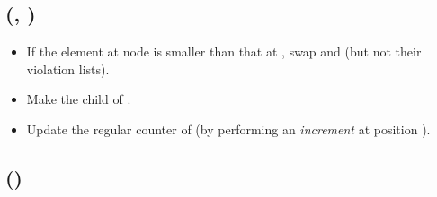 \documentclass{llncs}
\newcommand{\Insert}{\mbox{}}
\newcommand{\Meld}{\mbox{}}
\begin{document}
\subsection*{\Insert{}(, )}

\begin{itemize}
\item If the element at node  is smaller than that at 
  ,
 swap  and  (but not their violation lists).
\item Make  the child of .
\item Update the regular counter of  (by performing an {\it increment} at position ).
\end{itemize}

\subsection*{\Meld{}()}
\end{document}
